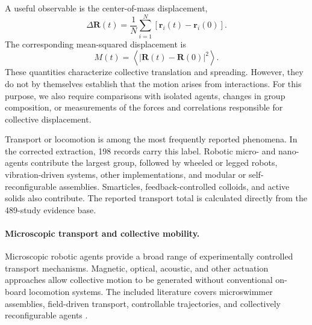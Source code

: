 A useful observable is the center-of-mass displacement,
\begin{equation}
\Delta\mathbf R(t)=
\frac{1}{N}\sum_{i=1}^{N}
\left[\mathbf r_i(t)-\mathbf r_i(0)\right].
\label{eq:phenomena-transport}
\end{equation}
The corresponding mean-squared displacement is
\begin{equation}
M(t)=
\left\langle
\left|\mathbf R(t)-\mathbf R(0)\right|^2
\right\rangle .
\label{eq:phenomena-transport-msd}
\end{equation}
These quantities characterize collective translation
and spreading. However, they do not by themselves
establish that the motion arises from interactions.
For this purpose, we also require comparisons with
isolated agents, changes in group composition, or
measurements of the forces and correlations
responsible for collective displacement.

Transport or locomotion is among the most frequently
reported phenomena. In the corrected extraction,
198 records carry this label. Robotic micro- and
nano-agents contribute the largest group,
followed by wheeled or legged robots,
vibration-driven systems, other implementations,
and modular or self-reconfigurable assemblies.
Smarticles, feedback-controlled colloids,
and active solids also contribute.
The reported transport total is calculated
directly from the 489-study evidence base.

\paragraph*{Microscopic transport and collective mobility.}

Microscopic robotic agents provide a broad range
of experimentally controlled transport mechanisms.
Magnetic, optical, acoustic, and other actuation
approaches allow collective motion to be generated
without conventional on-board locomotion systems.
The included literature covers microswimmer assemblies,
field-driven transport, controllable trajectories,
and collectively reconfigurable agents
\cite{Sun2021swarmingmicrodrople,Xie2020bioinspiredsoftmic,Pauer2021programmabledesign,MayorgaMartinez2023multimodaldrivenma,Yigit2019programmablecollect,Das2023optoelectronictraje,Rivas2023spatialpatterningo,McGovern2024multifunctionalchir,Feng2023weakionexchangeba,Sun2024multiplemagnetoopt,Cheng2025selfassemblyandco,Je2024spatiallyselective,Cao2024mofbasedmagneticm,Li2023swarmingresponsive,Liu2022bionicmorphological,Tural2025dropletbasedmicrof,Xu2023multiplecilialike,Yue2022wheellikemagnetic,Gong2025collectivereconfigu,Wang2018collectivebehavior,Chen2022programmablespatio,Xu2022collectivebehaviors,Liu2023swarmingmultifuncti,Ussia2024magneticmicrorobot,Tran2025roboticmicrocapsule,Xia2025artificialintellige,Jin2019mimickingthestruct,Wang2026reconfigurableassem,Kim2026magneticmxenebased,Won2019ondemandorbitalma}.

